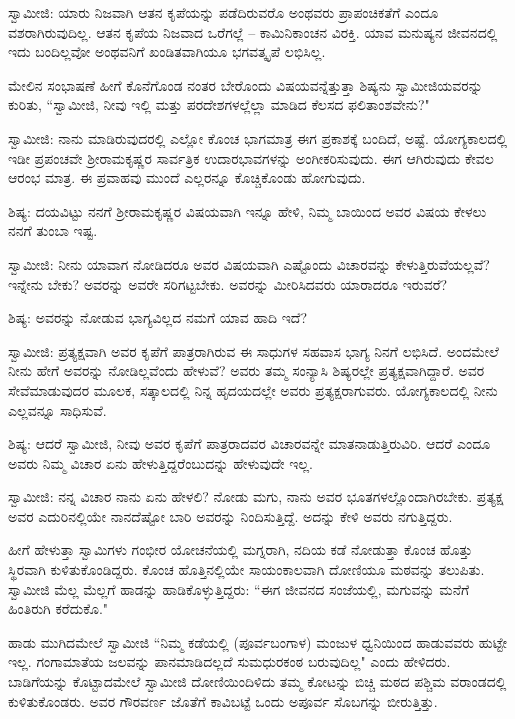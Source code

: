 ಸ್ವಾಮೀಜಿ: ಯಾರು ನಿಜವಾಗಿ ಆತನ ಕೃಪೆಯನ್ನು ಪಡೆದಿರುವರೊ ಅಂಥವರು ಪ್ರಾಪಂಚಿಕತೆಗೆ ಎಂದೂ ವಶರಾಗಿರುವುದಿಲ್ಲ. ಆತನ ಕೃಪೆಯ ನಿಜವಾದ ಒರೆಗಲ್ಲೆ – ಕಾಮಿನಿಕಾಂಚನ ವಿರಕ್ತಿ. ಯಾವ ಮನುಷ್ಯನ ಜೀವನದಲ್ಲಿ ಇದು ಬಂದಿಲ್ಲವೋ ಅಂಥವನಿಗೆ ಖಂಡಿತವಾಗಿಯೂ ಭಗವತ್ಕೃಪೆ ಲಭಿಸಿಲ್ಲ.

ಮೇಲಿನ ಸಂಭಾಷಣೆ ಹೀಗೆ ಕೊನೆಗೊಂಡ ನಂತರ ಬೇರೊಂದು ವಿಷಯವನ್ನೆತ್ತುತ್ತಾ ಶಿಷ್ಯನು ಸ್ವಾಮೀಜಿಯವರನ್ನು ಕುರಿತು, “ಸ್ವಾಮೀಜಿ, ನೀವು ಇಲ್ಲಿ ಮತ್ತು ಪರದೇಶಗಳಲ್ಲೆಲ್ಲಾ ಮಾಡಿದ ಕೆಲಸದ ಫಲಿತಾಂಶವೇನು?"

ಸ್ವಾಮೀಜಿ: ನಾನು ಮಾಡಿರುವುದರಲ್ಲಿ ಎಲ್ಲೋ ಕೊಂಚ ಭಾಗಮಾತ್ರ ಈಗ ಪ್ರಕಾಶಕ್ಕೆ ಬಂದಿದೆ, ಅಷ್ಟೆ. ಯೋಗ್ಯಕಾಲದಲ್ಲಿ ಇಡೀ ಪ್ರಪಂಚವೇ ಶ‍್ರೀರಾಮಕೃಷ್ಣರ ಸಾರ್ವತ್ರಿಕ ಉದಾರಭಾವಗಳನ್ನು ಅಂಗೀಕರಿಸುವುದು. ಈಗ ಆಗಿರುವುದು ಕೇವಲ ಆರಂಭ ಮಾತ್ರ. ಈ ಪ್ರವಾಹವು ಮುಂದೆ ಎಲ್ಲರನ್ನೂ ಕೊಚ್ಚಿಕೊಂಡು ಹೋಗುವುದು.

ಶಿಷ್ಯ: ದಯವಿಟ್ಟು ನನಗೆ ಶ‍್ರೀರಾಮಕೃಷ್ಣರ ವಿಷಯವಾಗಿ ಇನ್ನೂ ಹೇಳಿ, ನಿಮ್ಮ ಬಾಯಿಂದ ಅವರ ವಿಷಯ ಕೇಳಲು ನನಗೆ ತುಂಬಾ ಇಷ್ಟ.

ಸ್ವಾಮೀಜಿ: ನೀನು ಯಾವಾಗ ನೋಡಿದರೂ ಅವರ ವಿಷಯವಾಗಿ ಎಷ್ಟೊಂದು ವಿಚಾರವನ್ನು ಕೇಳುತ್ತಿರುವೆಯಲ್ಲವೆ? ಇನ್ನೇನು ಬೇಕು? ಅವರನ್ನು ಅವರೇ ಸರಿಗಟ್ಟಬೇಕು. ಅವರನ್ನು ಮೀರಿಸಿದವರು ಯಾರಾದರೂ ಇರುವರೆ?

ಶಿಷ್ಯ: ಅವರನ್ನು ನೋಡುವ ಭಾಗ್ಯವಿಲ್ಲದ ನಮಗೆ ಯಾವ ಹಾದಿ ಇದೆ?

ಸ್ವಾಮೀಜಿ: ಪ್ರತ್ಯಕ್ಷವಾಗಿ ಅವರ ಕೃಪೆಗೆ ಪಾತ್ರರಾಗಿರುವ ಈ ಸಾಧುಗಳ ಸಹವಾಸ ಭಾಗ್ಯ ನಿನಗೆ ಲಭಿಸಿದೆ. ಅಂದಮೇಲೆ ನೀನು ಹೇಗೆ ಅವರನ್ನು ನೋಡಿಲ್ಲವೆಂದು ಹೇಳುವೆ? ಅವರು ತಮ್ಮ ಸಂನ್ಯಾಸಿ ಶಿಷ್ಯರಲ್ಲೇ ಪ್ರತ್ಯಕ್ಷವಾಗಿದ್ದಾರೆ. ಅವರ ಸೇವೆಮಾಡುವುದರ ಮೂಲಕ, ಸತ್ಕಾಲದಲ್ಲಿ ನಿನ್ನ ಹೃದಯದಲ್ಲೇ ಅವರು ಪ್ರತ್ಯಕ್ಷರಾಗುವರು. ಯೋಗ್ಯಕಾಲದಲ್ಲಿ ನೀನು ಎಲ್ಲವನ್ನೂ ಸಾಧಿಸುವೆ.

ಶಿಷ್ಯ: ಆದರೆ ಸ್ವಾಮೀಜಿ, ನೀವು ಅವರ ಕೃಪೆಗೆ ಪಾತ್ರರಾದವರ ವಿಚಾರವನ್ನೇ ಮಾತನಾಡುತ್ತಿರುವಿರಿ. ಆದರೆ ಎಂದೂ ಅವರು ನಿಮ್ಮ ವಿಚಾರ ಏನು ಹೇಳುತ್ತಿದ್ದರೆಂಬುದನ್ನು ಹೇಳುವುದೇ ಇಲ್ಲ.

ಸ್ವಾಮೀಜಿ: ನನ್ನ ವಿಚಾರ ನಾನು ಏನು ಹೇಳಲಿ? ನೋಡು ಮಗು, ನಾನು ಅವರ ಭೂತಗಳಲ್ಲೊಂದಾಗಿರಬೇಕು. ಪ್ರತ್ಯಕ್ಷ ಅವರ ಎದುರಿನಲ್ಲಿಯೇ ನಾನದೆಷ್ಟೋ ಬಾರಿ ಅವರನ್ನು ನಿಂದಿಸುತ್ತಿದ್ದೆ. ಅದನ್ನು ಕೇಳಿ ಅವರು ನಗುತ್ತಿದ್ದರು.

ಹೀಗೆ ಹೇಳುತ್ತಾ ಸ್ವಾಮಿಗಳು ಗಂಭೀರ ಯೋಚನೆಯಲ್ಲಿ ಮಗ್ನರಾಗಿ, ನದಿಯ ಕಡೆ ನೋಡುತ್ತಾ ಕೊಂಚ ಹೊತ್ತು ಸ್ಥಿರವಾಗಿ ಕುಳಿತುಕೊಂಡಿದ್ದರು. ಕೊಂಚ ಹೊತ್ತಿನಲ್ಲಿಯೇ ಸಾಯಂಕಾಲವಾಗಿ ದೋಣಿಯೂ ಮಠವನ್ನು ತಲುಪಿತು. ಸ್ವಾಮೀಜಿ ಮೆಲ್ಲ ಮೆಲ್ಲಗೆ ಹಾಡನ್ನು ಹಾಡಿಕೊಳ್ಳುತ್ತಿದ್ದರು: “ಈಗ ಜೀವನದ ಸಂಜೆಯಲ್ಲಿ, ಮಗುವನ್ನು ಮನೆಗೆ ಹಿಂತಿರುಗಿ ಕರೆದುಕೊ."

ಹಾಡು ಮುಗಿದಮೇಲೆ ಸ್ವಾಮೀಜಿ “ನಿಮ್ಮ ಕಡೆಯಲ್ಲಿ (ಪೂರ್ವಬಂಗಾಳ) ಮಂಜುಳ ಧ್ವನಿಯಿಂದ ಹಾಡುವವರು ಹುಟ್ಟೇ ಇಲ್ಲ. ಗಂಗಾಮಾತೆಯ ಜಲವನ್ನು ಪಾನಮಾಡಿದಲ್ಲದೆ ಸುಮಧುರಕಂಠ ಬರುವುದಿಲ್ಲ" ಎಂದು ಹೇಳಿದರು. ಬಾಡಿಗೆಯನ್ನು ಕೊಟ್ಟಾದಮೇಲೆ ಸ್ವಾಮೀಜಿ ದೋಣಿಯಿಂದಿಳಿದು ತಮ್ಮ ಕೋಟನ್ನು ಬಿಚ್ಚಿ ಮಠದ ಪಶ್ಚಿಮ ವರಾಂಡದಲ್ಲಿ ಕುಳಿತುಕೊಂಡರು. ಅವರ ಗೌರವರ್ಣ ಜೊತೆಗೆ ಕಾವಿಬಟ್ಟೆ ಒಂದು ಅಪೂರ್ವ ಸೊಬಗನ್ನು ಬೀರುತ್ತಿತ್ತು.

\newpage

